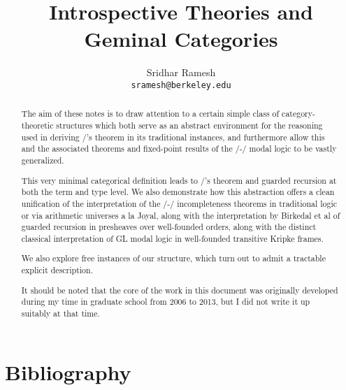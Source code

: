 \documentclass[12pt]{article}
\title{Introspective Theories and Geminal Categories}
\author{
  Sridhar Ramesh\\
  \texttt{sramesh@berkeley.edu}
}
\begin{document}
\maketitle

\begin{abstract}

The aim of these notes is to draw attention to a certain simple class of category-theoretic structures which both serve as an abstract environment for the reasoning used in deriving \Loeb/'s theorem in its traditional instances, and furthermore allow this and the associated theorems and fixed-point results of the \Goedel/-\Loeb/ modal logic to be vastly generalized.

This very minimal categorical definition leads to \Loeb/'s theorem and guarded recursion at both the term and type level. We also demonstrate how this abstraction offers a clean unification of the interpretation of the \Godel/-\Lob/ incompleteness theorems in traditional logic or via arithmetic universes a la Joyal, along with the interpretation by Birkedal et al of guarded recursion in presheaves over well-founded orders, along with the distinct classical interpretation of GL modal logic in well-founded transitive Kripke frames.

We also explore free instances of our structure, which turn out to admit a tractable explicit description.

It should be noted that the core of the work in this document was originally developed during my time in graduate school from 2006 to 2013, but I did not write it up suitably at that time.
\end{abstract}

\newpage
\tableofcontents

\newpage
\setcounter{section}{-1}
\setcounter{page}{1}












\newpage
\section{Bibliography}
\printbibliography

\printindex
\end{document}
